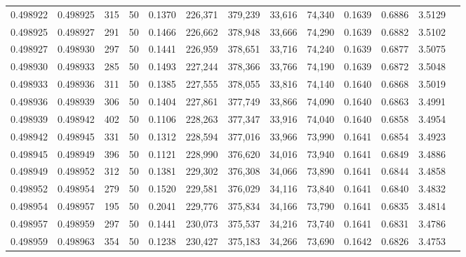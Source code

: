 \begin{tabular}{rrrrrrrrrrrrr}
0.498922 & 0.498925 & 315 &  50 &                                     0.1370 & 226,371 & 379,239 &  33,616 &  74,340 & 0.1639 & 0.6886 & 3.5129 \\
0.498925 & 0.498927 & 291 &  50 &                                     0.1466 & 226,662 & 378,948 &  33,666 &  74,290 & 0.1639 & 0.6882 & 3.5102 \\
0.498927 & 0.498930 & 297 &  50 &                                     0.1441 & 226,959 & 378,651 &  33,716 &  74,240 & 0.1639 & 0.6877 & 3.5075 \\
0.498930 & 0.498933 & 285 &  50 &                                     0.1493 & 227,244 & 378,366 &  33,766 &  74,190 & 0.1639 & 0.6872 & 3.5048 \\
0.498933 & 0.498936 & 311 &  50 &                                     0.1385 & 227,555 & 378,055 &  33,816 &  74,140 & 0.1640 & 0.6868 & 3.5019 \\
0.498936 & 0.498939 & 306 &  50 &                                     0.1404 & 227,861 & 377,749 &  33,866 &  74,090 & 0.1640 & 0.6863 & 3.4991 \\
0.498939 & 0.498942 & 402 &  50 &                                     0.1106 & 228,263 & 377,347 &  33,916 &  74,040 & 0.1640 & 0.6858 & 3.4954 \\
0.498942 & 0.498945 & 331 &  50 &                                     0.1312 & 228,594 & 377,016 &  33,966 &  73,990 & 0.1641 & 0.6854 & 3.4923 \\
0.498945 & 0.498949 & 396 &  50 &                                     0.1121 & 228,990 & 376,620 &  34,016 &  73,940 & 0.1641 & 0.6849 & 3.4886 \\
0.498949 & 0.498952 & 312 &  50 &                                     0.1381 & 229,302 & 376,308 &  34,066 &  73,890 & 0.1641 & 0.6844 & 3.4858 \\
0.498952 & 0.498954 & 279 &  50 &                                     0.1520 & 229,581 & 376,029 &  34,116 &  73,840 & 0.1641 & 0.6840 & 3.4832 \\
0.498954 & 0.498957 & 195 &  50 &                                     0.2041 & 229,776 & 375,834 &  34,166 &  73,790 & 0.1641 & 0.6835 & 3.4814 \\
0.498957 & 0.498959 & 297 &  50 &                                     0.1441 & 230,073 & 375,537 &  34,216 &  73,740 & 0.1641 & 0.6831 & 3.4786 \\
0.498959 & 0.498963 & 354 &  50 &                                     0.1238 & 230,427 & 375,183 &  34,266 &  73,690 & 0.1642 & 0.6826 & 3.4753 \\

\end{tabular}
